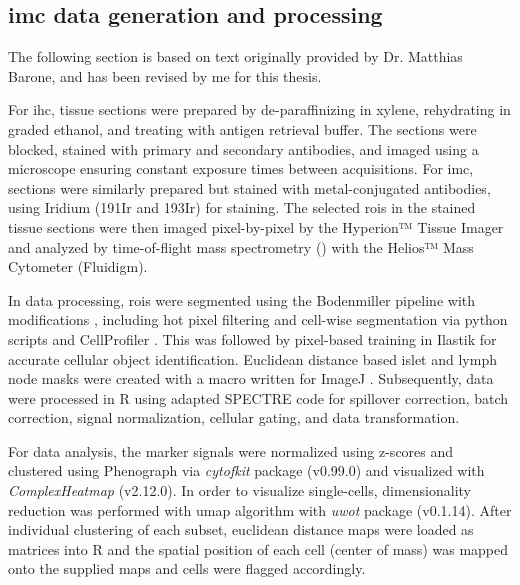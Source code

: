 \subsection[\glsentryshort{imc} data generation and processing]{\large \gls{imc} data generation and processing}
\label{subsec:met_chp2_imcdata}
\vspace{3mm}
\begin{Comment2}
\vspace{1mm}
\hspace{-3mm}
The following section is based on text originally provided by Dr. Matthias Barone, and has been revised by me for this thesis.
\vspace{1mm}
\end{Comment2}
\vspace{3mm}

For \gls{ihc}, tissue sections were prepared by de-paraffinizing in xylene, rehydrating in graded ethanol, and treating with antigen retrieval buffer. The sections were blocked, stained with primary and secondary antibodies, and imaged using a microscope ensuring constant exposure times between acquisitions. For \gls{imc}, sections were similarly prepared but stained with metal-conjugated antibodies, using Iridium (191Ir and 193Ir) for  staining. The selected \glspl{roi} in the stained tissue sections were then imaged pixel-by-pixel by the Hyperion™ Tissue Imager and analyzed by time-of-flight mass spectrometry () with the Helios™ Mass Cytometer (Fluidigm).\\

\par In data processing, \glspl{roi} were segmented using the Bodenmiller pipeline with modifications \textbf{\cite{eling_imc_2022}}, including hot pixel filtering and cell-wise segmentation via python scripts and CellProfiler \textbf{\cite{carpenter_cellprofiler_2006,mcquin_cellprofiler_2018}}. This was followed by pixel-based training in Ilastik \textbf{\cite{berg_ilastik_2019}} for accurate cellular object identification. Euclidean distance based islet and lymph node masks were created with a macro written for ImageJ \textbf{\cite{schneider_nih_2012}}. Subsequently, data were processed in R using adapted SPECTRE \textbf{\cite{ashhurst_integration_2022}} code for spillover correction, batch correction, signal normalization, cellular gating, and data transformation.\\

\par For data analysis, the marker signals were normalized using z-scores and clustered using Phenograph via \textit{cytofkit} package (v0.99.0) and visualized with \textit{ComplexHeatmap} (v2.12.0). In order to visualize single-cells, dimensionality reduction was performed with \gls{umap} algorithm with \textit{uwot} package (v0.1.14). After individual clustering of each subset, euclidean distance maps were loaded as matrices into R and the spatial position of each cell (center of mass) was mapped onto the supplied maps and cells were flagged accordingly.


